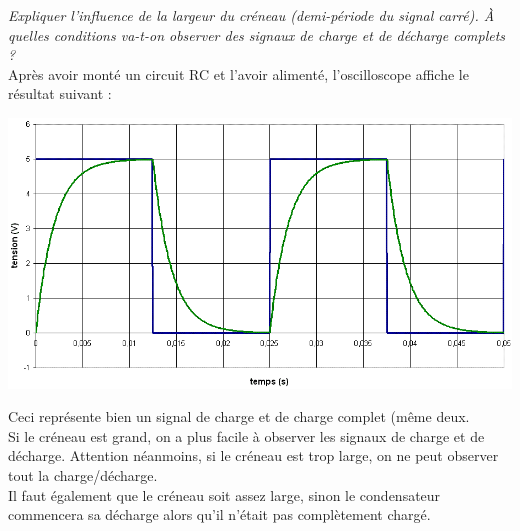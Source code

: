 \documentclass	[11pt, a4paper, openany]{book}
\begin{document}
		\textit{Expliquer l'influence de la largeur du créneau (demi-période du signal carré). À quelles conditions va-t-on observer des signaux de charge et de décharge complets ?}\\
		Après avoir monté un circuit RC et l'avoir alimenté, l'oscilloscope affiche le résultat suivant : 
		\begin{center}
			\includegraphics[scale=0.3]{labo/image19.png}
		\end{center}
		Ceci représente bien un signal de charge et de charge complet (même deux.\\
		Si le créneau est grand, on a plus facile à observer les signaux de charge et de décharge. Attention néanmoins, si le créneau est trop large, on ne peut observer tout la charge/décharge.\\
		Il faut également que le créneau soit assez large, sinon le condensateur commencera sa décharge alors qu'il n'était pas complètement chargé.\\
		
\end{document}
